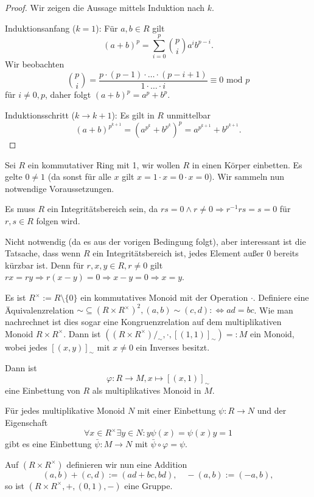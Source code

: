 \begin{proof}
    Wir zeigen die Aussage mittels Induktion nach $k$.

    Induktionsanfang ($k = 1$): Für $a,b\in R$ gilt
    $$ (a+b)^p = \sum_{i=0}^p {p \choose i} a^i b^{p-i}. $$
    Wir beobachten
    $$ {p \choose i} = \frac{p \cdot (p-1) \cdot \hdots \cdot (p-i+1)}{1\cdot \ldots \cdot i} \equiv 0 \text{ mod } p $$
    für $i\neq 0,p$, daher folgt $(a+b)^p= a^p+b^p$.

    Induktionsschritt ($k\to k+1$): Es gilt in $R$ unmittelbar
    $$(a+b)^{p^{k+1}}=(a^{p^k}+b^{p^k})^p=a^{p^{k+1}}+b^{p^{k+1}}.$$
\end{proof}

\begin{remark}\label{rem:ring-koerper}
    Sei $R$ ein kommutativer Ring mit 1, wir wollen $R$ in einen Körper einbetten. Es gelte $0 \neq 1$ (da sonst für alle $x$ gilt $ x = 1\cdot x = 0 \cdot x = 0$). Wir sammeln nun notwendige Voraussetzungen.

    Es muss $R$ ein Integritätsbereich sein, da $rs=0\land r\neq 0\Rightarrow r^{-1}rs=s=0$ für $r,s\in R$ folgen wird.

    Nicht notwendig (da es aus der vorigen Bedingung folgt), aber interessant ist die Tatsache, dass wenn $R$ ein Integritätsbereich ist, jedes Element außer $0$ bereits kürzbar ist.
    Denn für $r,x,y\in R,r\neq 0$ gilt $rx=ry\Rightarrow r(x-y)=0\Rightarrow x-y=0\Rightarrow x=y$.

    Es ist $R^\times := R \setminus \{0\}$ ein kommutatives Monoid mit der Operation $\cdot$. Definiere eine Äquivalenz\-relation $\sim \subseteq (R \times R^\times)^2, (a, b) \sim (c, d) :\Leftrightarrow ad = bc$. Wie man nachrechnet ist dies sogar eine Kongruenzrelation auf dem multiplikativen Monoid $R\times R^{\times}$. Dann ist $((R \times R^\times)/_\sim, \cdot, [(1,1)]_\sim) =: M$ ein Monoid, wobei jedes $[(x,y)]_\sim$ mit $x \neq 0$ ein Inverses besitzt.
    
    Dann ist
    $$ \varphi : R \to M, x \mapsto [(x, 1)]_\sim $$
    eine Einbettung von $R$ als multiplikatives Monoid in $M$.

    Für jedes multiplikative Monoid $N$ mit einer Einbettung $\psi : R \to N$ und der Eigenschaft
    $$\forall x\in R^\times\exists y\in N:y\psi(x)=\psi(x)y=1$$
    gibt es eine Einbettung $\bar{\psi} : M \to N$ mit $\bar{\psi} \circ \varphi = \psi$.

    Auf $(R\times R^\times)$ definieren wir nun eine Addition
    $$ (a,b) + (c,d) := (ad+bc, bd), \quad -(a,b) := (-a, b), $$
    so ist $(R \times R^\times, +, (0,1), -)$ eine Gruppe.
\end{remark}

